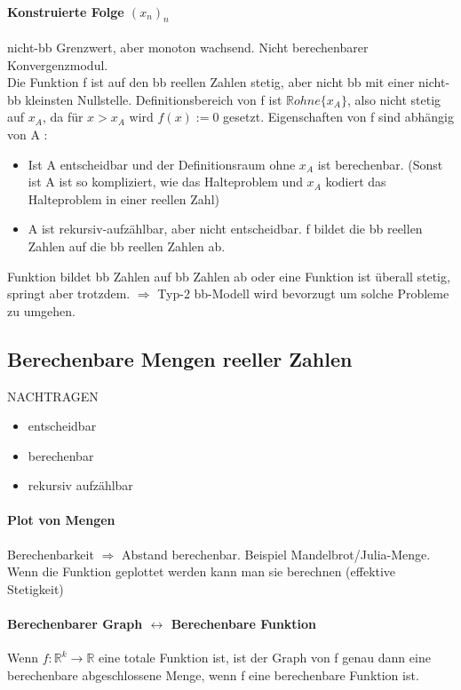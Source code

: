 \documentclass[ngerman]{scrartcl}
\begin{document}
\paragraph{Konstruierte Folge $ (x_n)_n $} nicht-bb Grenzwert, aber monoton wachsend. Nicht berechenbarer Konvergenzmodul. \\
Die Funktion f ist auf den bb reellen Zahlen stetig, aber nicht bb mit einer nicht-bb kleinsten Nullstelle. Definitionsbereich von f ist $ \mathbb{R} ohne \{x_A \} $, also nicht stetig auf $ x_A $, da für $ x > x_A$ wird $ f(x) := 0$ gesetzt. Eigenschaften von f sind abhängig von A :
\begin{itemize}
  \item Ist A entscheidbar und der Definitionsraum ohne $ x_A $ ist berechenbar. (Sonst ist A ist so kompliziert, wie das Halteproblem und $ x_A $ kodiert das Halteproblem in einer reellen Zahl)
  \item A ist rekursiv-aufzählbar, aber nicht entscheidbar. f bildet die bb reellen Zahlen auf die bb reellen Zahlen ab.
\end{itemize}
Funktion bildet bb Zahlen auf bb Zahlen ab oder eine Funktion ist überall stetig, springt aber trotzdem. $ \Rightarrow $ Typ-2 bb-Modell wird bevorzugt um solche Probleme zu umgehen.

\subsection{Berechenbare Mengen reeller Zahlen}
NACHTRAGEN

\begin{itemize}
  \item entscheidbar
  \item berechenbar
  \item rekursiv aufzählbar
\end{itemize}

\paragraph{Plot von Mengen} Berechenbarkeit $ \Rightarrow $ Abstand berechenbar. Beispiel Mandelbrot/Julia-Menge. Wenn die Funktion geplottet werden kann man sie berechnen (effektive Stetigkeit)

\paragraph{Berechenbarer Graph $ \leftrightarrow $ Berechenbare Funktion}
Wenn $ f: \mathbb{R}^k \rightarrow \mathbb{R} $ eine totale Funktion ist, ist der Graph von f genau dann eine berechenbare abgeschlossene Menge, wenn f eine berechenbare Funktion ist.
\end{document}
